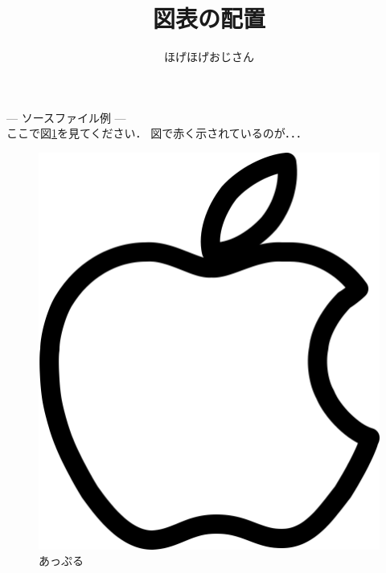 \documentclass[a4paper, 11pt, uplatex]{jsarticle}
\begin{document}
\title{図表の配置}
\author{ほげほげおじさん}
\maketitle


--- ソースファイル例 --- \\
ここで図\ref{figA}を見てください．
図で赤く示されているのが．．．
\begin{figure}
	\centering
	\includegraphics[scale=0.5]{apple.png}
	\caption{あっぷる}
	\label{figA}
\end{figure}
\end{document}
